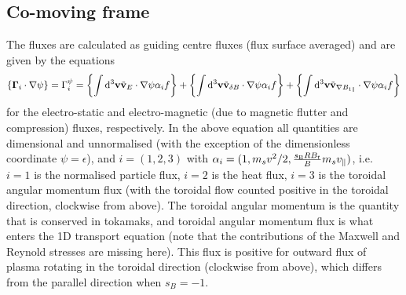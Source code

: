 \subsection{Co-moving frame}
The fluxes are calculated as guiding centre fluxes (flux surface averaged) and are given by the equations 
\begin{equation} 
\{\vec{\Gamma}_i \cdot \nabla \psi\} = \Gamma_i^\psi  = \biggl \{ \int {\rm d}^3 {\bf v} \tilde {\bf v}_E\cdot \nabla \psi  \alpha_i f \biggr \} + \biggl \{ \int {\rm d}^3 {\bf v} \tilde {\bf
v}_{\delta B}\cdot \nabla \psi  \alpha_i f \biggr \} 
+ \biggl \{ \int {\rm d}^3 {\bf v} \tilde {\bf v}_{\nabla B_{1 \parallel}} \cdot \nabla \psi  \alpha_i f \biggr \}
\end{equation}
for the electro-static and electro-magnetic (due to magnetic flutter and compression) fluxes, respectively.  
In the above equation all quantities are dimensional and unnormalised 
(with the exception of the dimensionless coordinate $\psi=\epsilon$), 
and $i = (1,2,3)$ with $\alpha_i = (1,m_sv^2/2,\frac{s\ind{B}RB_t}{B}m_sv_\parallel)$, i.e.\ $i = 1$ is the normalised particle flux, $i = 2$ is the heat flux, $i = 3$ is the toroidal angular momentum
flux (with the toroidal flow counted positive in the toroidal direction, clockwise from above).  The toroidal angular momentum is the quantity that is conserved in tokamaks,  and toroidal angular momentum flux is what enters the 1D transport equation (note that the contributions of the Maxwell and Reynold stresses are missing here). 
This flux is positive for outward flux of plasma rotating in the toroidal direction (clockwise from above), 
which differs from the parallel direction when $s_B = -1 $.  


